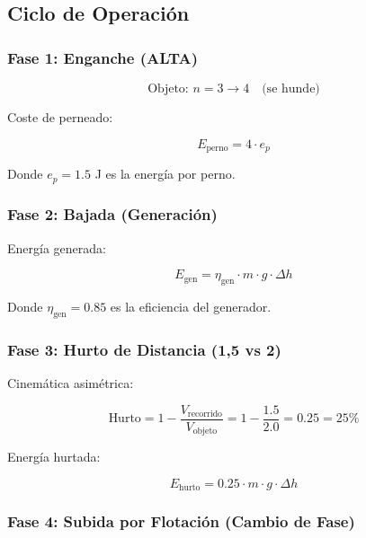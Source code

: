 \documentclass[12pt,a4paper]{article}
\begin{document}
\subsection{Ciclo de Operación}

\subsubsection{Fase 1: Enganche (ALTA)}

\begin{equation}
\text{Objeto: } n = 3 \rightarrow 4 \quad \text{(se hunde)}
\end{equation}

Coste de perneado:

\begin{equation}
E_{\text{perno}} = 4 \cdot e_p
\end{equation}

Donde $e_p = 1.5$ J es la energía por perno.

\subsubsection{Fase 2: Bajada (Generación)}

Energía generada:

\begin{equation}
E_{\text{gen}} = \eta_{\text{gen}} \cdot m \cdot g \cdot \Delta h
\end{equation}

Donde $\eta_{\text{gen}} = 0.85$ es la eficiencia del generador.

\subsubsection{Fase 3: Hurto de Distancia (1,5 vs 2)}

Cinemática asimétrica:

\begin{equation}
\text{Hurto} = 1 - \frac{V_{\text{recorrido}}}{V_{\text{objeto}}} = 1 - \frac{1.5}{2.0} = 0.25 = 25\%
\end{equation}

Energía hurtada:

\begin{equation}
E_{\text{hurto}} = 0.25 \cdot m \cdot g \cdot \Delta h
\end{equation}

\subsubsection{Fase 4: Subida por Flotación (Cambio de Fase)}
\end{document}
